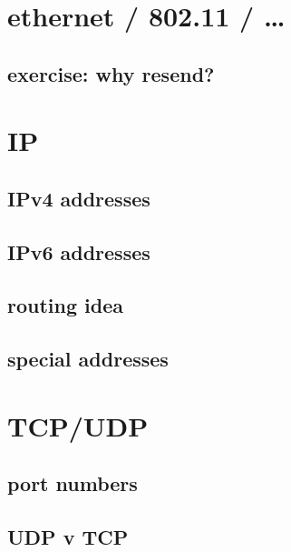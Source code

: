 \section{ethernet / 802.11 / \ldots}


\subsection{exercise: why resend?}


\section{IP}



\subsection{IPv4 addresses}


\subsection{IPv6 addresses}


\subsection{routing idea}


\subsection{special addresses}


\section{TCP/UDP}

\subsection{port numbers}


\subsection{UDP v TCP}



